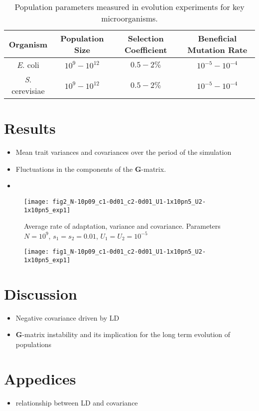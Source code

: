 \documentclass[11pt,one column]{article}
\begin{document}
\begin{table}[h]
	\centering
 	\begin{tabular}{ | c | c | c | c |}
    \hline
    Organism 												& Population Size 	& Selection Coefficient & Beneficial Mutation Rate \\ \hline
    \textit{E}. coli \cite{Perfeito2007}					& $10^9 - 10^{12}$ 	& $0.5 - 2 \%$  & $10^{-5} - 10^{-4}$ \\ \hline
    \textit{S}. cerevisiae \cite{desai2007speed,Levy2015}	& $10^9 - 10^{12}$ 	& $0.5 - 2 \%$  & $10^{-5} - 10^{-4}$ \\
    \hline
	\end{tabular}
	\caption{Population parameters measured in evolution experiments for key microorganisms.} 
	\label{Table 1}
\end{table}


\section*{Results}
\begin{itemize}
\item Mean trait variances and covariances over the period of the simulation
\item Fluctuations in the components of the \textbf{G}-matrix.
\item 
\end{itemize}

\begin{figure}[h]
\centering
\texttt{[image: fig2\_N-10p09\_c1-0d01\_c2-0d01\_U1-1x10pn5\_U2-1x10pn5\_exp1]}
\caption{Average rate of adaptation, variance and covariance. Parameters $N=10^9$, $s_1=s_2=0.01$, $U_1=U_2=10^{-5}$}
\label{fig.1}
\end{figure}

\begin{figure}[h]
\centering
\texttt{[image: fig1\_N-10p09\_c1-0d01\_c2-0d01\_U1-1x10pn5\_U2-1x10pn5\_exp1]}
\label{fig.2}
\end{figure}

\section*{Discussion}
\begin{itemize}
\item Negative covariance driven by LD
\item \textbf{G}-matrix instability and its implication for the long term evolution of populations
\end{itemize}




\section*{Appedices}
\begin{itemize}
\item relationship between LD and covariance
\end{itemize}
\end{document}
